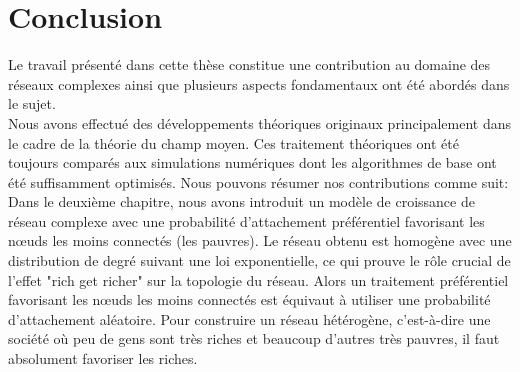 
\chapter*{Conclusion}
 


Le travail présenté dans cette thèse constitue une contribution au domaine des réseaux complexes ainsi que plusieurs aspects fondamentaux ont été abordés dans le sujet.\\
Nous avons effectué des développements théoriques originaux principalement dans le cadre de la théorie du champ moyen. Ces traitement théoriques ont été toujours comparés aux simulations numériques dont les algorithmes de base ont été suffisamment optimisés. Nous pouvons résumer nos contributions comme suit: \\
Dans le deuxième chapitre, nous avons introduit un modèle de croissance de réseau complexe avec une probabilité d'attachement préférentiel favorisant les nœuds les moins connectés (les pauvres). Le réseau obtenu est homogène avec une distribution de degré suivant une loi exponentielle, ce qui prouve le rôle crucial de l'effet "rich get richer" sur la topologie du réseau. Alors un traitement préférentiel favorisant les nœuds les moins connectés est équivaut à utiliser une probabilité d'attachement aléatoire. Pour construire un réseau hétérogène, c'est-à-dire une société où peu de gens sont très riches et beaucoup d'autres très pauvres, il faut absolument favoriser les riches.



